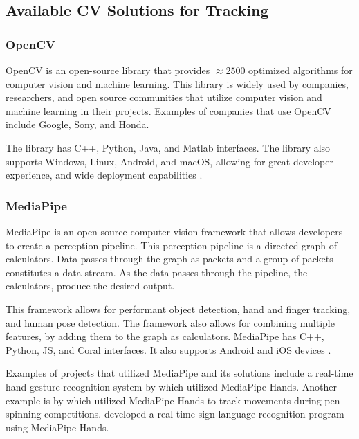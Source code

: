 \documentclass{report}
\begin{document}
\subsection{Available CV Solutions for Tracking}

\subsubsection{OpenCV}

OpenCV is an open-source library that provides ${\approx2500}$ optimized
algorithms for computer vision and machine learning. This library is widely used
by companies, researchers, and open source communities that utilize computer
vision and machine learning in their projects. Examples of companies that use
OpenCV include Google, Sony, and Honda.

The library has C++, Python, Java, and Matlab interfaces. The library also supports
Windows, Linux, Android, and macOS, allowing for great developer experience, and
wide deployment capabilities \parencite{opencv}.

\subsubsection{MediaPipe}
\label{section:rrl-mediapipe}

MediaPipe is an open-source computer vision framework that allows developers to
create a perception pipeline. This perception pipeline is a directed graph of
calculators. Data passes through the graph as packets and a group of packets
constitutes a data stream. As the data passes through the pipeline, the
calculators, produce the desired output.

This framework allows for performant object detection, hand and finger tracking,
and human pose detection. The framework also allows for combining multiple
features, by adding them to the graph as calculators. MediaPipe has C++, Python,
JS, and Coral interfaces. It also supports Android and iOS devices
\parencite{mediapipe}.

Examples of projects that utilized MediaPipe and its solutions include a
real-time hand gesture recognition system by \textcite{mediapipe-sample-1} which
utilized MediaPipe Hands. Another example is by \textcite{mediapipe-sample-2}
which utilized MediaPipe Hands to track movements during pen spinning
competitions. \textcite{mediapipe-sample-3} developed a real-time sign language
recognition program using MediaPipe Hands.
\end{document}
